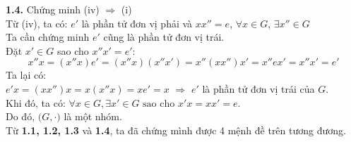 \textbf{1.4.} Chứng minh (iv) $\Rightarrow$ (i)\\
Từ (iv), ta có: $e'$ là phần tử đơn vị phải và $xx'' = e$, $\forall x \in G$, $\exists x'' \in G$\\
Ta cần chứng minh $e'$ cũng là phần tử đơn vị trái.\\
Đặt $x' \in G$ sao cho $x''x' = e'$:
$$x''x = (x''x)e' = (x''x)(x''x') = x''(xx'')x' = x''ex' = x''x' = e'$$
Ta lại có:\\
$e'x = (xx'')x = x(x''x) = xe' = x$ $\Rightarrow$ $e'$ là phần tử đơn vị trái của $G$.\\
Khi đó, ta có: $\forall x \in G, \exists x' \in G \text{ sao cho } x'x = xx' = e$.\\
Do đó, $\big( G, \cdot \big)$ là một nhóm.\\
Từ \textbf{1.1, 1.2, 1.3} và \textbf{1.4}, ta đã chứng mình được 4 mệnh đề trên tương đương.
\clearpage